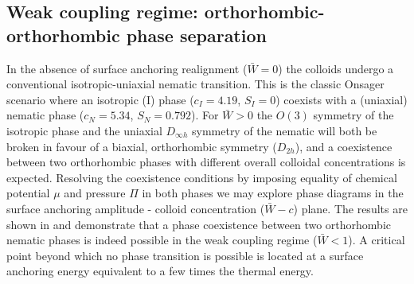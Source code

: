    \subsection{Weak coupling regime: orthorhombic-orthorhombic phase separation}

In the absence of surface anchoring realignment ($\bar{W} = 0$) the colloids undergo a conventional isotropic-uniaxial nematic transition. This is the classic Onsager scenario where an isotropic (I) phase  ($c_{I} = 4.19$, $S_{I} =0$) coexists with a (uniaxial) nematic phase  ($c_{N} = 5.34$, $S_{N} =0.792$). For $\bar{W} >0$ the $O(3)$ symmetry of the isotropic phase and the uniaxial $D_{\infty h}$ symmetry of the nematic will both be broken in favour of a biaxial, orthorhombic symmetry ($D_{2h}$), and a coexistence between two orthorhombic phases with different overall colloidal concentrations is expected. Resolving the coexistence conditions by imposing equality of chemical potential $\mu$ and pressure $\Pi$ in both phases we may explore phase diagrams in the surface anchoring amplitude - colloid concentration ($\bar{W} - c$) plane. The results are shown in  and demonstrate that a phase coexistence between two orthorhombic nematic phases is indeed possible in the weak coupling regime ($\bar{W} <1$). A critical point beyond which no phase transition is possible is located at a surface anchoring energy equivalent to a few times the thermal energy.

